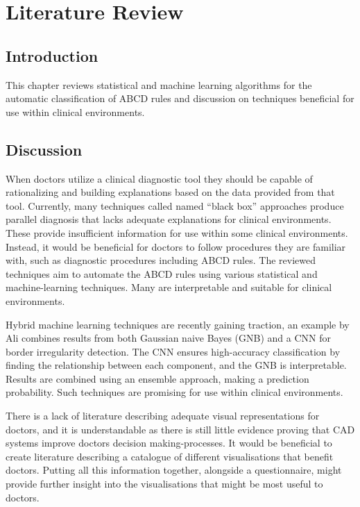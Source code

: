 \cleardoublepage
\chapter{Literature Review}

\section{Introduction}
This chapter reviews statistical and machine learning algorithms for the automatic classification of ABCD rules and discussion on techniques beneficial for use within clinical environments.

\section{Discussion}
When doctors utilize a clinical diagnostic tool they should be capable of rationalizing and building explanations based on the data provided from that tool. Currently, many techniques\cite{Andre2017} called named ``black box'' approaches produce parallel diagnosis that lacks adequate explanations for clinical environments. These provide insufficient information for use within some clinical environments\cite{Andre2017}. Instead, it would be beneficial for doctors to follow procedures they are familiar with, such as diagnostic procedures including ABCD rules. The reviewed techniques aim to automate the ABCD rules using various statistical and machine-learning techniques. Many are interpretable and suitable for clinical environments.

Hybrid machine learning techniques are recently gaining traction, an example by Ali combines results from both Gaussian naive Bayes (GNB) and a CNN\cite{Ali2020b} for border irregularity detection. The CNN ensures high-accuracy classification by finding the relationship between each component, and the GNB is interpretable. Results are combined using an ensemble approach, making a prediction probability. Such techniques are promising for use within clinical environments.

There is a lack of literature describing adequate visual representations for doctors, and it is understandable as there is still little evidence proving that CAD systems improve doctors decision making-processes\cite{FerrantediRuffano2018}. It would be beneficial to create literature describing a catalogue of different visualisations that benefit doctors. Putting all this information together, alongside a questionnaire, might provide further insight into the visualisations that might be most useful to doctors.

